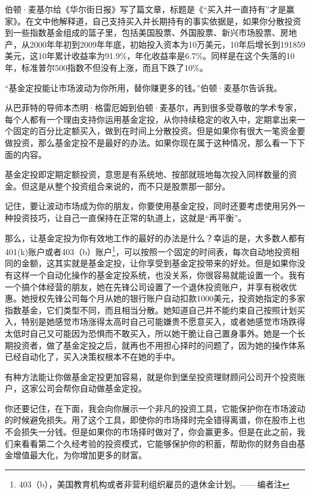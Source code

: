 伯顿·麦基尔给《华尔街日报》写了篇文章，标题是《“买入并一直持有”才是赢家》。在文中他解释道，自己支持买入并长期持有的事实依据是，如果你分散投资到一些指数基金组成的篮子里，包括美国股票、外国股票、新兴市场股票、房地产，从2000年年初到2009年年底，初始投入资本为10万美元，10年后增长到191859美元，这10年累计收益率为91.9\%，年化收益率是6.7\%。同样是在这个失落的10年，标准普尔500指数不但没有上涨，而且下跌了10\%。

“基金定投能让市场波动为你所用，替你赚更多的钱。”伯顿·麦基尔告诉我。

从巴菲特的导师本杰明·格雷厄姆到伯顿·麦基尔，再到很多受尊敬的学术专家，每个人都有一个理由支持你运用基金定投，从你持续稳定的收入中，定期拿出来一个固定的百分比定额买入，做到在时间上分散投资。但是如果你有很大一笔资金要做投资，那么基金定投不是最好的办法。如果你现在属于这种情况，那么看一下下面的内容。

基金定投即定期定额投资，意思是有系统地、按部就班地每次投入同样数量的资金。但这是从整个投资组合来说的，而不只是股票那一部分。

记住，要让波动市场成为你的朋友，你要使用基金定投，同时还要考虑使用另外一种投资技巧，让自己一直保持在正常的轨道上，这就是“再平衡”。

那么，让基金定投为你有效地工作的最好的办法是什么？幸运的是，大多数人都有401(k)账户或者403（b）账户\footnote{\label{fn:pdf-25-2}403（b），美国教育机构或者非营利组织雇员的退休金计划。——编者注}，可以按照一个固定的时间表，每次自动地投资相同的金额，这其实就是基金定投，让你享受到基金定投带来的好处。但是如果你没有这样一个自动化操作的基金定投系统，也没关系，你很容易就能设置一个。我有一个搞个体经营的朋友，她在先锋公司设置了一个退休投资账户，并享有税收优惠。她授权先锋公司每个月从她的银行账户自动扣款1000美元，投资她指定的多家指数基金，它们类型不同，而且相当分散。她知道自己并不能约束自己按照计划买入，特别是她感觉市场涨得太高时自己可能嫌贵不愿意买入，或者她感觉市场跌得太低时自己又可能因为恐惧而不敢买入，所以她干脆让自己置身事外。她是一个长期投资者，做了基金定投之后，就再也不用担心择时的问题了，因为她的操作体系已经自动化了，买入决策权根本不在她的手中。

有种方法能让你做基金定投更加容易，就是你到堡垒投资理财顾问公司开个投资账户，这家公司会帮你自动做基金定投。

你还要记住，在下面，我会向你展示一个非凡的投资工具，它能保护你在市场波动的时候避免损失。用了这个工具，即使你的市场择时完全错得离谱，你在股市上也不会损失一分钱。但是如果你的市场择时做对了，你会赢更多。但是在此之前，我们来看看第二个久经考验的投资模式，它能够保护你的积蓄，帮助你的财务自由基金增值最大化，为你增加更多的财富。

